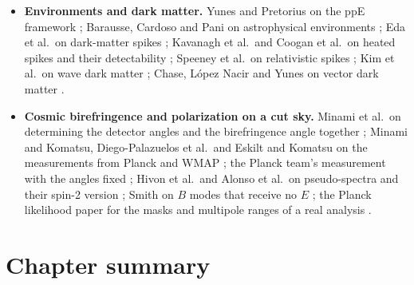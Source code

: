 \begin{itemize}[itemsep=2pt,leftmargin=1.2em]
        \cite{Robson2019}; Tinto and Dhurandhar on time-delay interferometry \cite{TintoDhurandhar2005}; Katz et al.\ on fast
        inspiral waveforms \cite{KatzFEW2021}; Littenberg and Cornish on the global fit \cite{LittenbergCornish2023}; the LISA
        Data Challenges \cite{BaghiLDC2022}.
  \item \textbf{Environments and dark matter.} Yunes and Pretorius on the ppE framework \cite{YunesPretorius2009}; Barausse,
        Cardoso and Pani on astrophysical environments \cite{Barausse2014}; Eda et al.\ on dark-matter spikes
        \cite{Eda2015}; Kavanagh et al.\ and Coogan et al.\ on heated spikes and their detectability
        \cite{Kavanagh2020,Coogan2022}; Speeney et al.\ on relativistic spikes \cite{Speeney2022}; Kim et al.\ on wave dark
        matter \cite{Kim2023}; Chase, L\'opez Nacir and Yunes on vector dark matter \cite{Chase2025}.
  \item \textbf{Cosmic birefringence and polarization on a cut sky.} Minami et al.\ on determining the detector angles
        and the birefringence angle together \cite{Minami2019}; Minami and Komatsu, Diego-Palazuelos et al.\ and Eskilt
        and Komatsu on the measurements from Planck and WMAP \cite{MinamiKomatsu2020,DiegoPalazuelos2022,EskiltKomatsu2022};
        the Planck team's measurement with the angles fixed \cite{PlanckIntXLIX2016}; Hivon et al.\ and Alonso et al.\ on
        pseudo-spectra and their spin-2 version \cite{Hivon2002,Alonso2019}; Smith on $B$ modes that receive no $E$
        \cite{SmithPureB2006}; the Planck likelihood paper for the masks and multipole ranges of a real analysis
        \cite{Planck2018V}.
\end{itemize}

\section*{Chapter summary}
\label{10b:sec:summary}

